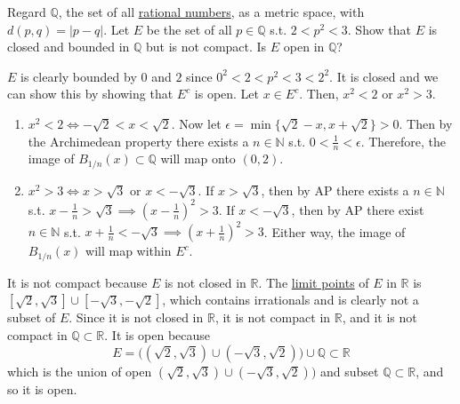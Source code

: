  \begin{exercise}[Rudin 2.15]

  \end{exercise}
  \begin{solution}
    
  \end{solution}

  \begin{exercise}[Rudin 2.16]
    Regard $\mathbb{Q}$, the set of all \hyperref[alg-def:rational-numbers]{rational numbers}, as a metric space, with $d(p, q) = |p - q|$. Let $E$ be the set of all $p \in \mathbb{Q}$ s.t. $2 < p^2 < 3$. Show that $E$ is closed and bounded in $\mathbb{Q}$ but is not compact. Is $E$ open in $\mathbb{Q}$? 
  \end{exercise}
  \begin{solution}
    $E$ is clearly bounded by $0$ and $2$ since $0^2 < 2 < p^2 < 3 < 2^2$. It is closed and we can show this by showing that $E^c$ is open. Let $x \in E^c$. Then, $x^2< 2$ or $x^2 > 3$. 
    \begin{enumerate}
      \item $x^2 < 2 \iff -\sqrt{2} < x < \sqrt{2}$. Now let $\epsilon = \min\{ \sqrt{2} - x, x + \sqrt{2}\} > 0$. Then by the Archimedean property there exists a $n \in \mathbb{N}$ s.t. $0 < \frac{1}{n} < \epsilon$. Therefore, the image of $B_{1/n} (x) \subset \mathbb{Q}$ will map onto $(0, 2)$. 

      \item $x^2 > 3 \iff x > \sqrt{3}$ or $x < - \sqrt{3}$. If $x > \sqrt{3}$, then by AP there exists a $n \in \mathbb{N}$ s.t. $x - \frac{1}{n} > \sqrt{3} \implies (x - \frac{1}{n})^2 > 3$. If $x < - \sqrt{3}$, then by AP there exist $n \in \mathbb{N}$ s.t. $x + \frac{1}{n} < -\sqrt{3} \implies (x + \frac{1}{n})^2 > 3$. Either way, the image of $B_{1/n} (x)$ will map within $E^c$. 
    \end{enumerate}
    It is not compact because $E$ is not closed in $\mathbb{R}$. The \hyperref[pst-def:limit-point]{limit points} of $E$ in $\mathbb{R}$ is $[\sqrt{2}, \sqrt{3}] \cup [-\sqrt{3}, -\sqrt{2}]$, which contains irrationals and is clearly not a subset of $E$. Since it is not closed in $\mathbb{R}$, it is not compact in $\mathbb{R}$, and it is not compact in $\mathbb{Q} \subset \mathbb{R}$. It is open because 
    \begin{equation}
      E = \big( (\sqrt{2}, \sqrt{3}) \cup (-\sqrt{3}, \sqrt{2})\big) \cup \mathbb{Q} \subset \mathbb{R}
    \end{equation}
    which is the union of open $(\sqrt{2}, \sqrt{3}) \cup (-\sqrt{3}, \sqrt{2})\big)$ and subset $\mathbb{Q} \subset \mathbb{R}$, and so it is open. 
  \end{solution}

